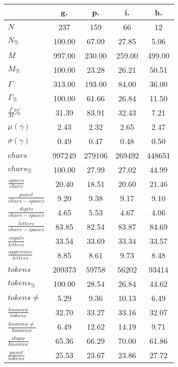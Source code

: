 \begin{table}[h!]
\begin{center}
\begin{tabular}{| l || c | c | c | c |}\hline
 & {\bf g.} & {\bf p.} & {\bf i.} & {\bf h.} \\\hline\hline
$N$ & 237  & 159  & 66  & 12 \\
$N_{\%}$ & 100.00  & 67.09  & 27.85  & 5.06 \\\hline
$M$ & 997.00  & 230.00  & 259.00  & 499.00 \\
$M_{\%}$ & 100.00  & 23.28  & 26.21  & 50.51 \\\hline
$\Gamma$ & 313.00  & 193.00  & 84.00  & 36.00 \\
$\Gamma_{\%}$ & 100.00  & 61.66  & 26.84  & 11.50 \\\hline
$\frac{\Gamma}{M}\%$ & 31.39  & 83.91  & 32.43  & 7.21 \\
$\mu(\gamma)$ & 2.43  & 2.32  & 2.65  & 2.47 \\
$\sigma(\gamma)$ & 0.49  & 0.47  & 0.48  & 0.50 \\\hline\hline
$chars$ & 997249  & 279106  & 269492  & 448651 \\
$chars_{\%}$ & 100.00  & 27.99  & 27.02  & 44.99 \\\hline
$\frac{spaces}{chars}$ & 20.40  & 18.51  & 20.60  & 21.46 \\
$\frac{punct}{chars-spaces}$ & 9.20  & 9.38  & 9.17  & 9.10 \\
$\frac{digits}{chars-spaces}$ & 4.65  & 5.53  & 4.67  & 4.06 \\\hline
$\frac{letters}{chars-spaces}$ & 83.85  & 82.54  & 83.87  & 84.69 \\
$\frac{vogals}{letters}$ & 33.54  & 33.69  & 33.34  & 33.57 \\
$\frac{uppercase}{letters}$ & 8.85  & 8.61  & 9.73  & 8.48 \\\hline\hline
$tokens$ & 209373  & 59758  & 56202  & 93414 \\
$tokens_{\%}$ & 100.00  & 28.54  & 26.84  & 44.62 \\
$tokens \neq$ & 5.29  & 9.36  & 10.13  & 6.49 \\\hline
$\frac{knownw}{tokens}$ & 32.70  & 33.27  & 33.16  & 32.07 \\
$\frac{knownw \neq}{knownw}$ & 6.49  & 12.62  & 14.19  & 9.71 \\\hline
$\frac{stopw}{knownw}$ & 65.36  & 66.29  & 70.00  & 61.86 \\
$\frac{punct}{tokens}$ & 25.53  & 23.67  & 23.86  & 27.72 \\

\end{tabular}
\end{center}
\end{table}
